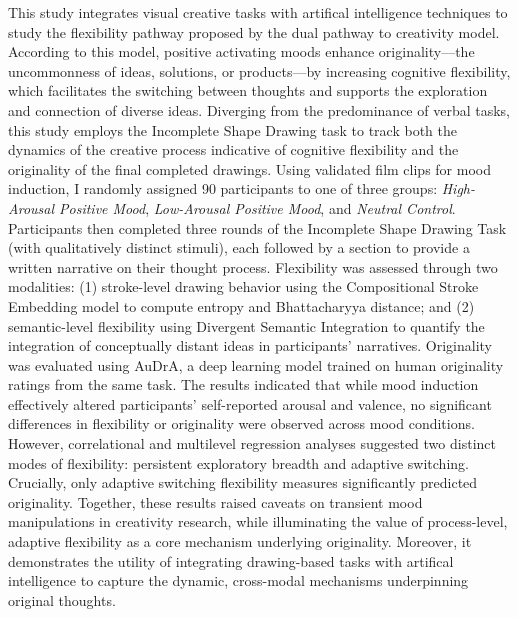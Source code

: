 \documentclass[../MA_Thesis.tex]{subfiles}
\begin{document}
This study integrates visual creative tasks with artifical intelligence techniques to study the flexibility pathway proposed by the dual pathway to creativity model. According to this model, positive activating moods enhance originality—the uncommonness of ideas, solutions, or products—by increasing cognitive flexibility, which facilitates the switching between thoughts and supports the exploration and connection of diverse ideas. Diverging from the predominance of verbal tasks, this study employs the Incomplete Shape Drawing task to track both the dynamics of the creative process indicative of cognitive flexibility and the originality of the final completed drawings. Using validated film clips for mood induction, I randomly assigned 90 participants to one of three groups: \textit{High-Arousal Positive Mood}, \textit{Low-Arousal Positive Mood}, and \textit{Neutral Control}. Participants then completed three rounds of the Incomplete Shape Drawing Task (with qualitatively distinct stimuli), each followed by a section to provide a written narrative on their thought process. Flexibility was assessed through two modalities: (1) stroke-level drawing behavior using the Compositional Stroke Embedding model to compute entropy and Bhattacharyya distance; and (2) semantic-level flexibility using Divergent Semantic Integration to quantify the integration of conceptually distant ideas in participants’ narratives. Originality was evaluated using AuDrA, a deep learning model trained on human originality ratings from the same task. The results indicated that while mood induction effectively altered participants’ self-reported arousal and valence, no significant differences in flexibility or originality were observed across mood conditions. However, correlational and multilevel regression analyses suggested two distinct modes of flexibility: persistent exploratory breadth and adaptive switching. Crucially, only adaptive switching flexibility measures significantly predicted originality. Together, these results raised caveats on transient mood manipulations in creativity research, while illuminating the value of process-level, adaptive flexibility as a core mechanism underlying originality. Moreover, it demonstrates the utility of integrating drawing-based tasks with artifical intelligence to capture the dynamic, cross-modal mechanisms underpinning original thoughts.
\end{document}
